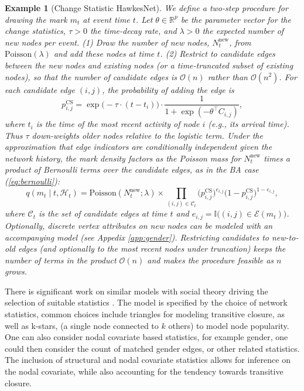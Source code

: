 \documentclass[12pt]{article}
\newtheorem{example}{Example}
\begin{document}
\begin{example}[Change Statistic HawkesNet]
We define a two-step procedure for drawing the mark $m_t$ at event time $t$. Let $\theta \in \mathbb{R}^{p}$ be the parameter vector for the change statistics, $\tau > 0$ the time-decay rate, and $\lambda > 0$ the expected number of new nodes per event. (1) Draw the number of new nodes, $N_t^{\text{new}}$, from $\text{Poisson}(\lambda)$ and add these nodes at time $t$. (2) Restrict to candidate edges between the new nodes and existing nodes (or a time-truncated subset of existing nodes), so that the number of candidate edges is $\mathcal{O}(n)$ rather than $\mathcal{O}(n^2)$. For each candidate edge $(i,j)$, the probability of adding the edge is
\begin{equation}\label{eqn:csdraw}
p_{i,j}^{\text{CS}} = \exp\bigl(-\tau \cdot (t - t_i)\bigr) \cdot \frac{1}{1 + \exp(-\theta^{\top} C_{i,j})},
\end{equation}
where $t_i$ is the time of the most recent activity of node $i$ (e.g., its arrival time). Thus $\tau$ down-weights older nodes relative to the logistic term. Under the approximation that edge indicators are conditionally independent given the network history, the mark density factors as the Poisson mass for $N_t^{\text{new}}$ times a product of Bernoulli terms over the candidate edges, as in the BA case (\ref{eq:bernoulli}):
\begin{equation}\label{eq:csdensity}
q(m_t \mid t, \mathcal{H}_t) = \text{Poisson}(N_t^{\text{new}}; \lambda) \times \prod_{(i,j) \in \mathcal{C}_t} \bigl(p_{i,j}^{\text{CS}}\bigr)^{e_{i,j}} \bigl(1 - p_{i,j}^{\text{CS}}\bigr)^{1 - e_{i,j}},
\end{equation}
where $\mathcal{C}_t$ is the set of candidate edges at time $t$ and $e_{i,j} = \mathbb{I}\bigl((i,j) \in \mathcal{E}(m_t)\bigr)$. Optionally, discrete vertex attributes on new nodes can be modeled with an accompanying model (see Appedix \ref{app:gender}). Restricting candidates to new-to-old edges (and optionally to the most recent nodes under truncation) keeps the number of terms in the product $\mathcal{O}(n)$ and makes the procedure feasible as $n$ grows.
\end{example}

There is significant work on similar models \cite{Fellows2018,lusher2012} with social theory driving the selection of suitable statistics \cite{snijders2006}. The model is specified by the choice of network statistics, common choices include triangles for modeling transitive closure, as well as k-stars, (a single node connected to $k$ others) to model node popularity. One can also consider nodal covariate  based statistics, for example gender, one could then consider the count of matched gender edges, or other related statistics. The inclusion of structural and nodal covariate statistics allows for inference on the nodal covariate, while also accounting for the tendency towards transitive closure.
\end{document}
